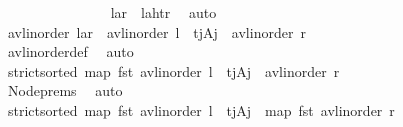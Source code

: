 \begin{isabellebody}
\ \ \ \ \ \ \ \ \ \ \ \ \ \ \isamarkupfalse%
\ {\isacartoucheopen}{\isasymlangle}l{\isacharcomma}{\kern0pt}a{\isacharcomma}{\kern0pt}r{\isasymrangle}\ {\isacharequal}{\kern0pt}\ {\isasymlangle}l{\isacharcomma}{\kern0pt}{\isacharparenleft}{\kern0pt}a{\isacharprime}{\kern0pt}{\isacharcomma}{\kern0pt}ht{\isacharparenright}{\kern0pt}{\isacharcomma}{\kern0pt}r{\isasymrangle}{\isacartoucheclose}\ \isamarkupfalse%
\ auto\isanewline
\ \ \ \ \ \ \ \ \ \ \ \ \isamarkupfalse%
\ \isamarkupfalse%
\ {\isachardoublequoteopen}avl{\isacharunderscore}{\kern0pt}inorder\ {\isasymlangle}l{\isacharcomma}{\kern0pt}a{\isacharcomma}{\kern0pt}r{\isasymrangle}\ {\isacharequal}{\kern0pt}\ avl{\isacharunderscore}{\kern0pt}inorder\ l\ {\isacharat}{\kern0pt}\ {\isacharparenleft}{\kern0pt}t\isactrlsub j{\isacharcomma}{\kern0pt}A\isactrlsub j{\isacharparenright}{\kern0pt}\ {\isacharhash}{\kern0pt}\ avl{\isacharunderscore}{\kern0pt}inorder\ r{\isachardoublequoteclose}\isanewline
\ \ \ \ \ \ \ \ \ \ \ \ \ \ \isamarkupfalse%
\ avl{\isacharunderscore}{\kern0pt}inorder{\isacharunderscore}{\kern0pt}def\ \isamarkupfalse%
\ auto\isanewline
\ \ \ \ \ \ \ \ \ \ \ \ \isamarkupfalse%
\ \isamarkupfalse%
\ {\isachardoublequoteopen}strict{\isacharunderscore}{\kern0pt}sorted\ {\isacharparenleft}{\kern0pt}map\ fst\ {\isacharparenleft}{\kern0pt}avl{\isacharunderscore}{\kern0pt}inorder\ l\ {\isacharat}{\kern0pt}\ {\isacharparenleft}{\kern0pt}t\isactrlsub j{\isacharcomma}{\kern0pt}A\isactrlsub j{\isacharparenright}{\kern0pt}\ {\isacharhash}{\kern0pt}\ avl{\isacharunderscore}{\kern0pt}inorder\ r{\isacharparenright}{\kern0pt}{\isacharparenright}{\kern0pt}{\isachardoublequoteclose}\isanewline
\ \ \ \ \ \ \ \ \ \ \ \ \ \ \isamarkupfalse%
\ Node{\isachardot}{\kern0pt}prems\ \isamarkupfalse%
\ auto\isanewline
\ \ \ \ \ \ \ \ \ \ \ \ \isamarkupfalse%
\ \isamarkupfalse%
\ {\isachardoublequoteopen}strict{\isacharunderscore}{\kern0pt}sorted\ {\isacharparenleft}{\kern0pt}map\ fst\ {\isacharparenleft}{\kern0pt}avl{\isacharunderscore}{\kern0pt}inorder\ l\ {\isacharat}{\kern0pt}\ {\isacharbrackleft}{\kern0pt}{\isacharparenleft}{\kern0pt}t\isactrlsub j{\isacharcomma}{\kern0pt}A\isactrlsub j{\isacharparenright}{\kern0pt}{\isacharbrackright}{\kern0pt}{\isacharparenright}{\kern0pt}\ {\isacharat}{\kern0pt}\ map\ fst\ {\isacharparenleft}{\kern0pt}avl{\isacharunderscore}{\kern0pt}inorder\ r{\isacharparenright}{\kern0pt}{\isacharparenright}{\kern0pt}{\isachardoublequoteclose}\isanewline

\end{isabellebody}

